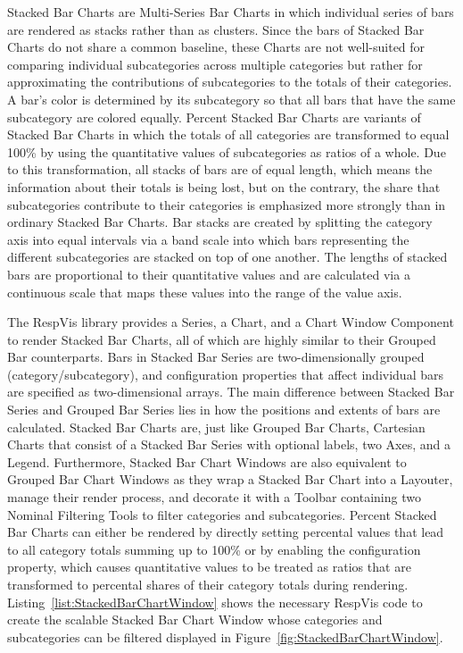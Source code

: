 Stacked Bar Charts are Multi-Series Bar Charts in which individual series of bars are rendered as stacks rather than as clusters.
Since the bars of Stacked Bar Charts do not share a common baseline, these Charts are not well-suited for comparing individual subcategories across multiple categories but rather for approximating the contributions of subcategories to the totals of their categories.
A bar's color is determined by its subcategory so that all bars that have the same subcategory are colored equally.  
Percent Stacked Bar Charts are variants of Stacked Bar Charts in which the totals of all categories are transformed to equal 100\% by using the quantitative values of subcategories as ratios of a whole.
Due to this transformation, all stacks of bars are of equal length, which means the information about their totals is being lost, but on the contrary, the share that subcategories contribute to their categories is emphasized more strongly than in ordinary Stacked Bar Charts.
Bar stacks are created by splitting the category axis into equal intervals via a band scale into which bars representing the different subcategories are stacked on top of one another.
The lengths of stacked bars are proportional to their quantitative values and are calculated via a continuous scale that maps these values into the range of the value axis.

The RespVis library provides a Series, a Chart, and a Chart Window Component to render Stacked Bar Charts, all of which are highly similar to their Grouped Bar counterparts.
Bars in Stacked Bar Series are two-dimensionally grouped (category/subcategory), and configuration properties that affect individual bars are specified as two-dimensional arrays.
The main difference between Stacked Bar Series and Grouped Bar Series lies in how the positions and extents of bars are calculated.
Stacked Bar Charts are, just like Grouped Bar Charts, Cartesian Charts that consist of a Stacked Bar Series with optional labels, two Axes, and a Legend.
Furthermore, Stacked Bar Chart Windows are also equivalent to Grouped Bar Chart Windows as they wrap a Stacked Bar Chart into a Layouter, manage their render process, and decorate it with a Toolbar containing two Nominal Filtering Tools to filter categories and subcategories.  
Percent Stacked Bar Charts can either be rendered by directly setting percental values that lead to all category totals summing up to 100\% or by enabling the  configuration property, which causes quantitative values to be treated as ratios that are transformed to percental shares of their category totals during rendering.
Listing~\ref{list:StackedBarChartWindow} shows the necessary RespVis code to create the scalable Stacked Bar Chart Window whose categories and subcategories can be filtered displayed in Figure~\ref{fig:StackedBarChartWindow}.
 
